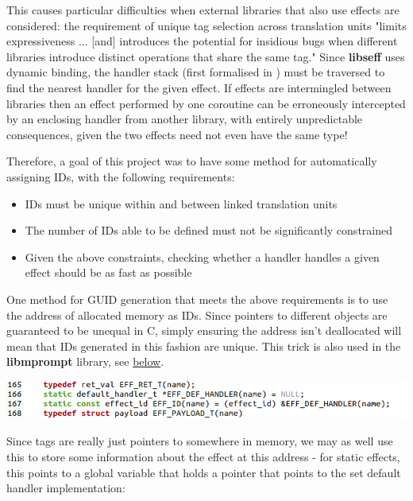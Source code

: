 \documentclass[logo,bsc,singlespacing,parskip,online]{infthesis}
\begin{document}
This causes particular difficulties when external libraries that also use effects are considered: the requirement of unique tag selection across translation units "limits expressiveness ... [and] introduces the potential for insidious bugs when different libraries introduce distinct operations that share the same tag."\cite{libseff_paper} Since \textbf{libseff} uses dynamic binding\cite{libseff_paper}, the handler stack (first formalised in \textcite{handler-stack-first}) must be traversed to find the nearest handler for the given effect. If effects are intermingled between libraries then an effect performed by one coroutine can be erroneously intercepted by an enclosing handler from another library, with entirely unpredictable consequences, given the two effects need not even have the same type!

Therefore, a goal of this project was to have some method for automatically assigning IDs, with the following requirements:

\begin{itemize}
\item IDs must be unique within and between linked translation units
\item The number of IDs able to be defined must not be significantly constrained
\item Given the above constraints, checking whether a handler handles a given effect should be as fast as possible
\end{itemize}

One method for GUID generation that meets the above requirements is to use the address of allocated memory as IDs. Since pointers to different objects are guaranteed to be unequal in C\textcite[see § 6.5.10 para 7]{iso9899-2024}, simply ensuring the address isn't deallocated will mean that IDs generated in this fashion are unique. This trick is also used in the \textbf{libmprompt} library, see \href{https://github.com/koka-lang/libmprompt/blob/main/include/mpeff.h#L155}{below}.\cite{libmprompt}

\includegraphics[scale=0.7]{ID_def_code.png}

Since tags are really just pointers to somewhere in memory, we may as well use this to store some information about the effect at this address - for static effects, this points to a global variable that holds a pointer that points to the set default handler implementation:
\end{document}

